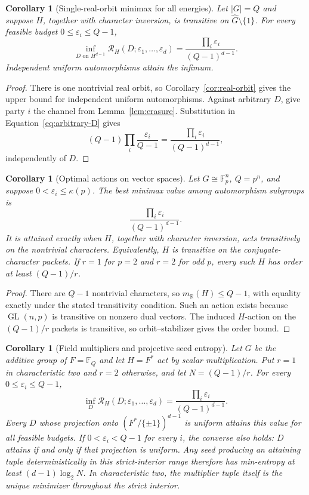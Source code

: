 \documentclass[11pt]{article}
\newtheorem{corollary}[theorem]{Corollary}
\theoremstyle{definition}
\newcommand{\F}{\mathbb{F}}
\begin{document}
\begin{corollary}[Single-real-orbit minimax for all energies]
\label{cor:all-energy}
Let $|G|=Q$ and suppose $H$, together with character inversion, is transitive
on $\widehat G\setminus\{1\}$.  For every feasible budget
$0\leq\varepsilon_i\leq Q-1$,
\[
 \inf_{D\text{ on }H^{d-1}}
 \mathcal R_H(D;\varepsilon_1,\ldots,\varepsilon_d)
 =\frac{\prod_i\varepsilon_i}{(Q-1)^{d-1}}.
\]
Independent uniform automorphisms attain the infimum.
\end{corollary}

\begin{proof}
There is one nontrivial real orbit, so Corollary~\ref{cor:real-orbit} gives the
upper bound for independent uniform automorphisms.  Against arbitrary $D$, give
party $i$ the channel from Lemma~\ref{lem:erasure}.  Substitution in
Equation~\eqref{eq:arbitrary-D} gives
\[
 (Q-1)\prod_i\frac{\varepsilon_i}{Q-1}
 =\frac{\prod_i\varepsilon_i}{(Q-1)^{d-1}},
\]
independently of $D$.
\end{proof}

\begin{corollary}[Optimal actions on vector spaces]\label{cor:actions}
Let $G\cong\F_p^n$, $Q=p^n$, and suppose
$0<\varepsilon_i\leq\kappa(p)$.  The best minimax value among
automorphism subgroups is
\[
 \frac{\prod_i\varepsilon_i}{(Q-1)^{d-1}}.
\]
It is attained exactly when $H$, together with character inversion, acts
transitively on the nontrivial characters.  Equivalently, $H$ is transitive on
the conjugate-character packets.  If $r=1$ for $p=2$ and $r=2$ for odd $p$,
every such $H$ has order at least $(Q-1)/r$.
\end{corollary}

\begin{proof}
There are $Q-1$ nontrivial characters, so
$m_{\mathbb R}(H)\leq Q-1$, with equality exactly under the stated
transitivity condition.  Such an action exists because
$\operatorname{GL}(n,p)$ is transitive on nonzero dual vectors.  The induced
$H$-action on the $(Q-1)/r$ packets is transitive, so orbit--stabilizer gives
the order bound.
\end{proof}

\begin{corollary}[Field multipliers and projective seed entropy]
\label{cor:entropy}
Let $G$ be the additive group of $F=\F_Q$ and let $H=F^*$ act by scalar
multiplication.  Put $r=1$ in characteristic two and $r=2$ otherwise, and let
$N=(Q-1)/r$.  For every $0\leq\varepsilon_i\leq Q-1$,
\[
 \inf_D\mathcal R_H(D;\varepsilon_1,\ldots,\varepsilon_d)
 =\frac{\prod_i\varepsilon_i}{(Q-1)^{d-1}}.
\]
Every $D$ whose projection onto $(F^*/\{\pm1\})^{d-1}$ is uniform attains this
value for all feasible budgets.  If
$0<\varepsilon_i<Q-1$ for every $i$, the converse also holds: $D$ attains if
and only if that projection is uniform.  Any seed producing an attaining tuple
deterministically in this strict-interior range therefore has min-entropy at
least $(d-1)\log_2 N$.  In characteristic two, the multiplier tuple itself is
the unique minimizer throughout the strict interior.
\end{corollary}
\end{document}
